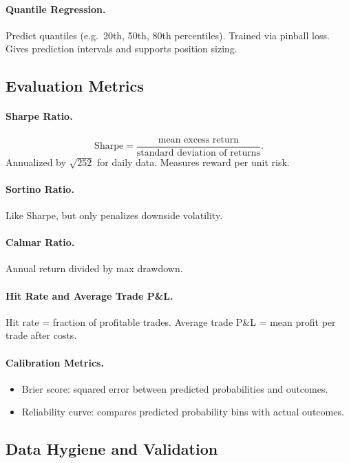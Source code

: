 \documentclass[11pt]{article}
\begin{document}
    \paragraph{Quantile Regression.}
    Predict quantiles (e.g.\ 20th, 50th, 80th percentiles). Trained via pinball loss. Gives prediction intervals and supports position sizing.

    \subsection{Evaluation Metrics}

    \paragraph{Sharpe Ratio.}
    \[
        \text{Sharpe} = \frac{\text{mean excess return}}{\text{standard deviation of returns}}.
    \]
    Annualized by $\sqrt{252}$ for daily data. Measures reward per unit risk.

    \paragraph{Sortino Ratio.}
    Like Sharpe, but only penalizes downside volatility.

    \paragraph{Calmar Ratio.}
    Annual return divided by max drawdown.

    \paragraph{Hit Rate and Average Trade P\&L.}
    Hit rate = fraction of profitable trades.
    Average trade P\&L = mean profit per trade after costs.

    \paragraph{Calibration Metrics.}
    \begin{itemize}
        \item Brier score: squared error between predicted probabilities and outcomes.
        \item Reliability curve: compares predicted probability bins with actual outcomes.
    \end{itemize}

    \subsection{Data Hygiene and Validation}
\end{document}
